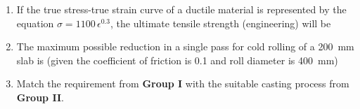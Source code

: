 \documentclass[journal,12pt,onecolumn]{IEEEtran}
\theoremstyle{remark}
\begin{document}
\begin{enumerate}
     \item If the true stress-true strain curve of a ductile material is represented by the equation $\sigma = 1100\,\epsilon^{0.3}$, the ultimate tensile strength (engineering) will be
    \hfill{}
    \begin{enumerate}[label=(\Alph*)]
    \end{enumerate} 
    \item The maximum possible reduction in a single pass for cold rolling of a 200~mm slab is (given the coefficient of friction is 0.1 and roll diameter is 400~mm)
    \hfill{}
    \begin{enumerate}[label=(\Alph*)]
    \end{enumerate}
    \item Match the requirement from \textbf{Group I} with the suitable casting process from \textbf{Group II}.


\end{enumerate}
\end{document}
